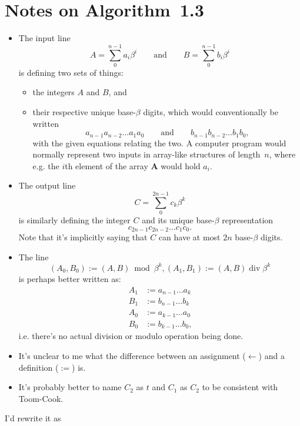 \documentclass{computer-arithmetic}
\begin{document}
\section{Notes on Algorithm~1.3}

\begin{itemize}
\item The input line
  \[
    A = \sum_0^{n-1} a_i β^i \qquad \text{and} \qquad
    B = \sum_0^{n-1} b_i β^i
  \]
  is defining two sets of things:
  \begin{itemize}
  \item the integers \(A\) and \(B\), and
  \item their respective unique base-\(β\) digits, which would
    conventionally be written
    \[
      a_{n-1} a_{n-2} \dotso a_1 a_0 \qquad \text{and} \qquad
      b_{n-1} b_{n-2} \dotso b_1 b_0\text{,}
    \]
    with the given equations relating the two. A computer program
    would normally represent two inputs in array-like structures of
    length~\(n\), where e.g. the \(i\)th element of the array
    \(\mathbf{A}\) would hold \(a_i\).
  \end{itemize}
\item The output line
  \[
    C = ∑_0^{2n-1} c_k β^k
  \]
  is similarly defining the integer \(C\) and its unique base-\(β\)
  representation
  \[
    c_{2n-1} c_{2n-2} \dotso c_1 c_0\text{.}
  \]
  Note that it's implicitly saying that \(C\) can have at most \(2n\)
  base-\(β\) digits.
\item The line
  \[
    (A_0, B_0) := (A, B) \bmod β^k, (A_1, B_1) := (A, B) \operatorname{div} β^k
  \]
  is perhaps better written as:
  \begin{align*}
    A_1 &:= a_{n-1} \dotso a_k \\
    B_1 &:= b_{n-1} \dotso b_k \\
    A_0 &:= a_{k-1} \dotso a_0 \\
    B_0 &:= b_{k-1} \dotso b_0\text{,}
  \end{align*}
  i.e. there's no actual division or modulo operation being done.
\item It's unclear to me what the difference between an assignment (\(←\))
  and a definition (\(:=\)) is.
\item It's probably better to name \(C_2\) as \(t\) and \(C_1\) as
  \(C_2\) to be consistent with Toom-Cook.
\end{itemize}

I'd rewrite it as
\end{document}
